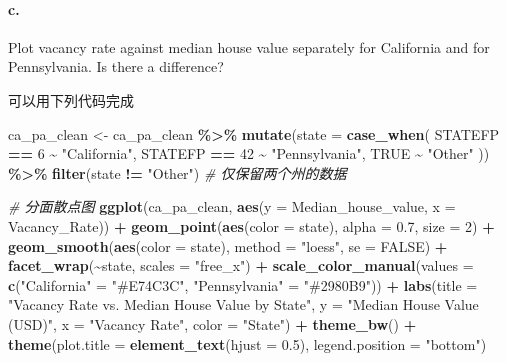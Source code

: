\documentclass[
]{article}
\newenvironment{Shaded}{\begin{snugshade}}{\end{snugshade}}
\newcommand{\AttributeTok}[1]{\textcolor[rgb]{0.13,0.29,0.53}{#1}}
\newcommand{\CommentTok}[1]{\textcolor[rgb]{0.56,0.35,0.01}{\textit{#1}}}
\newcommand{\ConstantTok}[1]{\textcolor[rgb]{0.56,0.35,0.01}{#1}}
\newcommand{\DecValTok}[1]{\textcolor[rgb]{0.00,0.00,0.81}{#1}}
\newcommand{\FloatTok}[1]{\textcolor[rgb]{0.00,0.00,0.81}{#1}}
\newcommand{\FunctionTok}[1]{\textcolor[rgb]{0.13,0.29,0.53}{\textbf{#1}}}
\newcommand{\NormalTok}[1]{#1}
\newcommand{\OtherTok}[1]{\textcolor[rgb]{0.56,0.35,0.01}{#1}}
\newcommand{\SpecialCharTok}[1]{\textcolor[rgb]{0.81,0.36,0.00}{\textbf{#1}}}
\newcommand{\StringTok}[1]{\textcolor[rgb]{0.31,0.60,0.02}{#1}}
\begin{document}
\paragraph{c.}\label{c.-1}

Plot vacancy rate against median house value separately for California
and for Pennsylvania. Is there a difference?

可以用下列代码完成

\begin{Shaded}
\begin{Highlighting}[]
\NormalTok{ca\_pa\_clean }\OtherTok{\textless{}{-}}\NormalTok{ ca\_pa\_clean }\SpecialCharTok{\%\textgreater{}\%}
  \FunctionTok{mutate}\NormalTok{(}\AttributeTok{state =} \FunctionTok{case\_when}\NormalTok{(}
\NormalTok{    STATEFP }\SpecialCharTok{==} \DecValTok{6} \SpecialCharTok{\textasciitilde{}} \StringTok{"California"}\NormalTok{,}
\NormalTok{    STATEFP }\SpecialCharTok{==} \DecValTok{42} \SpecialCharTok{\textasciitilde{}} \StringTok{"Pennsylvania"}\NormalTok{,}
    \ConstantTok{TRUE} \SpecialCharTok{\textasciitilde{}} \StringTok{"Other"}
\NormalTok{  )) }\SpecialCharTok{\%\textgreater{}\%}
  \FunctionTok{filter}\NormalTok{(state }\SpecialCharTok{!=} \StringTok{"Other"}\NormalTok{)  }\CommentTok{\# 仅保留两个州的数据}

\CommentTok{\# 分面散点图}
\FunctionTok{ggplot}\NormalTok{(ca\_pa\_clean, }\FunctionTok{aes}\NormalTok{(}\AttributeTok{y =}\NormalTok{ Median\_house\_value, }\AttributeTok{x =}\NormalTok{ Vacancy\_Rate)) }\SpecialCharTok{+}
  \FunctionTok{geom\_point}\NormalTok{(}\FunctionTok{aes}\NormalTok{(}\AttributeTok{color =}\NormalTok{ state), }\AttributeTok{alpha =} \FloatTok{0.7}\NormalTok{, }\AttributeTok{size =} \DecValTok{2}\NormalTok{) }\SpecialCharTok{+}
  \FunctionTok{geom\_smooth}\NormalTok{(}\FunctionTok{aes}\NormalTok{(}\AttributeTok{color =}\NormalTok{ state), }\AttributeTok{method =} \StringTok{"loess"}\NormalTok{, }\AttributeTok{se =} \ConstantTok{FALSE}\NormalTok{) }\SpecialCharTok{+}
  \FunctionTok{facet\_wrap}\NormalTok{(}\SpecialCharTok{\textasciitilde{}}\NormalTok{state, }\AttributeTok{scales =} \StringTok{"free\_x"}\NormalTok{) }\SpecialCharTok{+}  
  \FunctionTok{scale\_color\_manual}\NormalTok{(}\AttributeTok{values =} \FunctionTok{c}\NormalTok{(}\StringTok{"California"} \OtherTok{=} \StringTok{"\#E74C3C"}\NormalTok{, }
                                \StringTok{"Pennsylvania"} \OtherTok{=} \StringTok{"\#2980B9"}\NormalTok{)) }\SpecialCharTok{+}
  \FunctionTok{labs}\NormalTok{(}\AttributeTok{title =} \StringTok{"Vacancy Rate vs. Median House Value by State"}\NormalTok{,}
       \AttributeTok{y =} \StringTok{"Median House Value (USD)"}\NormalTok{,}
       \AttributeTok{x =} \StringTok{"Vacancy Rate"}\NormalTok{,}
       \AttributeTok{color =} \StringTok{"State"}\NormalTok{) }\SpecialCharTok{+}
  \FunctionTok{theme\_bw}\NormalTok{() }\SpecialCharTok{+}
  \FunctionTok{theme}\NormalTok{(}\AttributeTok{plot.title =} \FunctionTok{element\_text}\NormalTok{(}\AttributeTok{hjust =} \FloatTok{0.5}\NormalTok{),}
        \AttributeTok{legend.position =} \StringTok{"bottom"}\NormalTok{)}
\end{Highlighting}
\end{Shaded}
\end{document}
